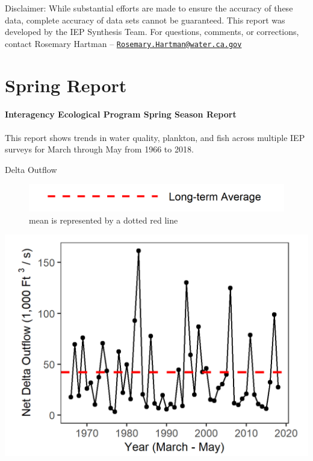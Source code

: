 \documentclass[
]{book}
\begin{document}
\begin{disclaimer}
Disclaimer: While substantial efforts are made to ensure the accuracy of
these data, complete accuracy of data sets cannot be guaranteed. This
report was developed by the IEP Synthesis Team. For questions, comments,
or corrections, contact Rosemary Hartman --
\href{mailto:Rosemary.Hartman@water.ca.gov}{\nolinkurl{Rosemary.Hartman@water.ca.gov}}
\end{disclaimer}

\hypertarget{Spring}{%
\chapter{Spring Report}\label{Spring}}

\hypertarget{interagency-ecological-program-spring-season-report}{%
\subsubsection{Interagency Ecological Program Spring Season Report}\label{interagency-ecological-program-spring-season-report}}

This report shows trends in water quality, plankton, and fish across multiple IEP
surveys for March through May from 1966 to 2018.

Delta Outflow

\begin{figure}
\includegraphics[width=15.25in]{figures/mline} \caption{mean is represented by a dotted red line}\label{fig:unnamed-chunk-4}
\end{figure}

\includegraphics[width=15.25in]{figures/spring_outflow_update}
\end{document}
